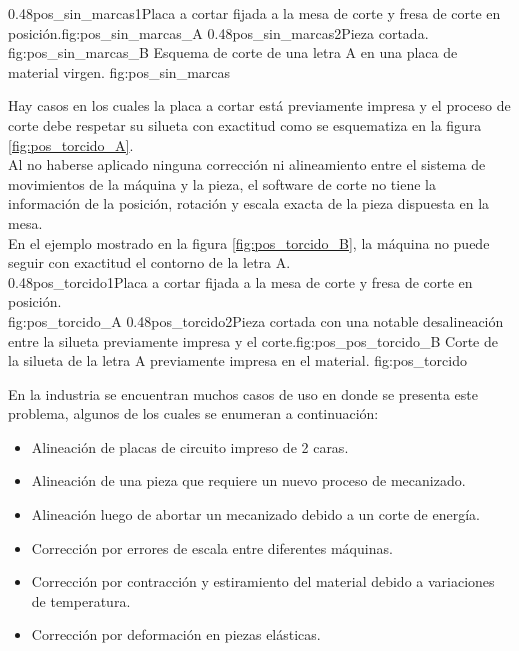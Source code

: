 \subfigab
         {0.48}{pos_sin_marcas1}{Placa a cortar fijada a la mesa de corte y fresa de corte en posición.}{fig:pos_sin_marcas_A}
         {0.48}{pos_sin_marcas2}{Pieza cortada.\\ \hphantom{1}}{fig:pos_sin_marcas_B}
         {Esquema de corte de una letra A en una placa de material virgen.}
         {fig:pos_sin_marcas}

         Hay casos en los cuales la placa a cortar está previamente impresa y el proceso de corte debe respetar su silueta con exactitud como se esquematiza en la figura \ref{fig:pos_torcido_A}. \\
         Al no haberse aplicado ninguna corrección ni alineamiento entre el sistema de movimientos de la máquina y la pieza, el software de corte no tiene la información de la posición, rotación y escala exacta de la pieza dispuesta en la mesa. \\
         En el ejemplo mostrado en la figura \ref{fig:pos_torcido_B}, la máquina no puede seguir con exactitud el contorno de la letra A.\\

\subfigab
         {0.48}{pos_torcido1}{Placa a cortar fijada a la mesa de corte y fresa de corte en posición.\\ \vphantom{1}}{fig:pos_torcido_A}
         {0.48}{pos_torcido2}{Pieza cortada con una notable desalineación entre la silueta previamente impresa y el corte.}{fig:pos_pos_torcido_B}
         {Corte de la silueta de la letra A previamente impresa en el material.}
         {fig:pos_torcido}

         En la industria se encuentran muchos casos de uso en donde se presenta este problema, algunos de los cuales se enumeran a continuación:
\begin{itemize}
   \item{Alineación de placas de circuito impreso de 2 caras.}
   \item{Alineación de una pieza que requiere un nuevo proceso de mecanizado.}
   \item{Alineación luego de abortar un mecanizado debido a un corte de energía.}
   \item{Corrección por errores de escala entre diferentes máquinas.}
   \item{Corrección por contracción y estiramiento del material debido a variaciones de temperatura.}
   \item{Corrección por deformación en piezas elásticas.}
\end{itemize}

